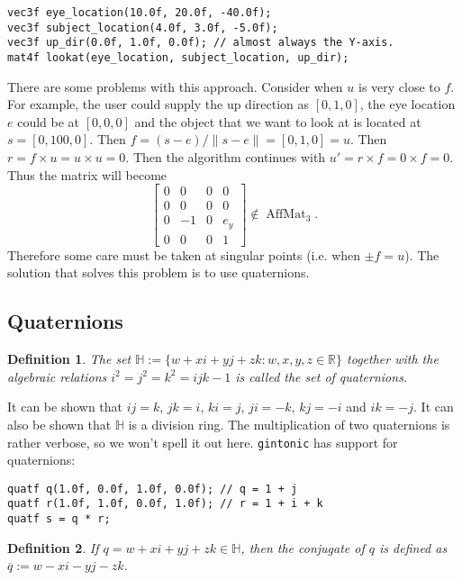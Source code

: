 \documentclass{article}
\newtheorem{definition}{Definition}
\DeclareMathOperator{\AffMat}{AffMat}
\begin{document}
\begin{lstlisting}
vec3f eye_location(10.0f, 20.0f, -40.0f);
vec3f subject_location(4.0f, 3.0f, -5.0f);
vec3f up_dir(0.0f, 1.0f, 0.0f); // almost always the Y-axis.
mat4f lookat(eye_location, subject_location, up_dir);
\end{lstlisting}

There are some problems with this approach. Consider when $u$ is very close to $f$. For example, the user could supply the up direction as $[0,1,0]$, the eye location $e$ could be at $[0,0,0]$ and the object that we want to look at is located at $s = [0,100,0]$. Then $f = (s-e) / \|s-e\| = [0,1,0] = u$. Then $r = f \times u = u \times u = 0$. Then the algorithm continues with $u' = r \times f = 0 \times f = 0$. Thus the matrix will become
\[ \begin{bmatrix}
0 & 0 & 0 & 0 \\
0 & 0 & 0 & 0 \\
0 & -1& 0 & e_y \\
0 & 0 & 0 & 1
\end{bmatrix} \not\in \AffMat_3. \]
Therefore some care must be taken at singular points (i.e. when $\pm f = u$). The solution that solves this problem is to use quaternions.

\subsection{Quaternions}

\begin{definition}
The set $\mathbb{H} := \{w + xi + yj + zk : w,x,y,z \in \mathbb{R}\}$ together with the algebraic relations $i^2 = j^2 = k^2 = ijk -1$ is called the set of quaternions.
\end{definition}
It can be shown that $ij = k$, $jk = i$, $ki = j$, $ji = -k$, $kj = -i$ and $ik = -j$. It can also be shown that $\mathbb{H}$ is a division ring. The multiplication of two quaternions is rather verbose, so we won't spell it out here. \texttt{gintonic} has support for quaternions:

\begin{lstlisting}
quatf q(1.0f, 0.0f, 1.0f, 0.0f); // q = 1 + j
quatf r(1.0f, 1.0f, 0.0f, 1.0f); // r = 1 + i + k
quatf s = q * r;
\end{lstlisting}

\begin{definition}
If $q = w+xi+yj+zk \in \mathbb{H}$, then the \emph{conjugate} of $q$ is defined as $\overline{q} := w - xi -yj - zk$.
\end{definition}
\end{document}
